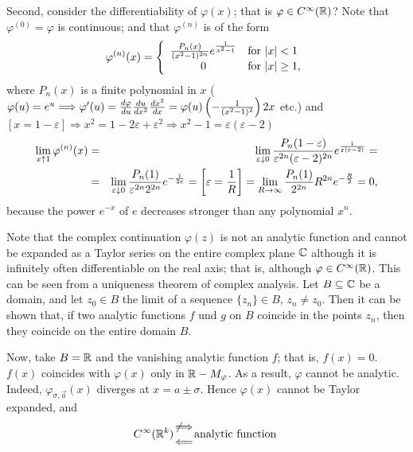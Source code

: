 {Second, consider the differentiability of $\varphi (x)$;
that is $\varphi\in C^\infty({\Bbb R})$?
Note that
$\varphi^{(0)}=\varphi$ is continuous;
and that $\varphi^{(n)}$ is of the form
$$
   \varphi^{(n)}(x)=\left\{\begin{array}{cl}
                         {P_n(x)\over(x^2-1)^{2n}}    e^{1\over x^2-1}&\mbox{for $|x|<1$}\\
                         0&\mbox{for $|x|\geq1$,}
                    \end{array}\right.
$$
where $P_n(x)$ is a finite polynomial in $x$
 ($\varphi(u)=e^u\Longrightarrow
\varphi'(u)={d\varphi\over du}{du\over dx^2}{dx^2\over dx}=\varphi(u)
\left(-{1\over(x^2-1)^2}\right)2x$ etc.) and $[x=1-\varepsilon]\Longrightarrow
x^2=1-2\varepsilon+\varepsilon^2\Longrightarrow x^2-1=
\varepsilon(\varepsilon-2)$
\begin{eqnarray*}
   \lim_{x\uparrow1}\varphi^{(n)}(x)&=&\lim_{\varepsilon\downarrow0}
      {P_n(1-\varepsilon)\over\varepsilon^{2n}(\varepsilon-2)^{2n}}
      e^{1\over\varepsilon(\varepsilon-2)}=\\
   &=&\lim_{\varepsilon\downarrow0}{P_n(1)\over\varepsilon^{2n}2^{2n}}
      e^{-{1\over2\varepsilon}}=\left[\varepsilon={1\over R}\right]=
      \lim_{R\to\infty}{P_n(1)\over2^{2n}}R^{2n}e^{-{R\over2}}=0,
\end{eqnarray*}
because the power $e^{-x}$ of $e$
decreases stronger
than any polynomial  $x^n$.

Note that the complex continuation
$\varphi (z)$ is not an analytic function and cannot be expanded as a Taylor series on the
entire complex plane ${\Bbb C}$ although it is infinitely often
differentiable on the real axis; that is, although
$\varphi\in C^\infty({\Bbb R})$.
This can be seen from a uniqueness theorem of complex analysis.
Let
 $B\subseteq{\Bbb C}$ be a domain, and
let
$z_0\in B$ the limit of a sequence
$\{z_n\}\in B$, $z_n\ne z_0$.
Then it can be shown that, if two
analytic functions
$f$ und $g$ on $B$  coincide in the points $z_n$,
then they coincide on the entire domain $B$.

Now, take  $B={\Bbb R}$ and
the  vanishing analytic function $f$; that is,
$f(x)=0$.
$f(x)$ coincides with $\varphi (x)$ only in
 ${\Bbb R} - M_\varphi$.
As a result, $\varphi$ cannot be analytic.
Indeed, $\varphi_{\sigma,\vec a}(x)$  diverges at $x=a\pm\sigma$.
Hence $\varphi(x)$ cannot be Taylor expanded, and
$$
   C^\infty({\Bbb R}^k){\not\Longrightarrow\atop\Longleftarrow}
   \mbox{analytic function }
$$
\eproof
}

